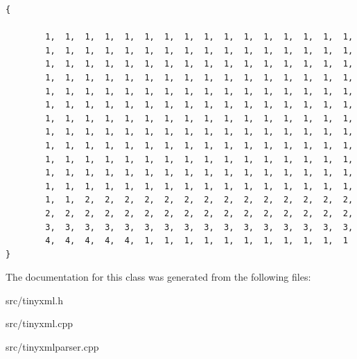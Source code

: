 \footnotesize\begin{verbatim} 
{
    
        1,  1,  1,  1,  1,  1,  1,  1,  1,  1,  1,  1,  1,  1,  1,  1,  
        1,  1,  1,  1,  1,  1,  1,  1,  1,  1,  1,  1,  1,  1,  1,  1,  
        1,  1,  1,  1,  1,  1,  1,  1,  1,  1,  1,  1,  1,  1,  1,  1,  
        1,  1,  1,  1,  1,  1,  1,  1,  1,  1,  1,  1,  1,  1,  1,  1,  
        1,  1,  1,  1,  1,  1,  1,  1,  1,  1,  1,  1,  1,  1,  1,  1,  
        1,  1,  1,  1,  1,  1,  1,  1,  1,  1,  1,  1,  1,  1,  1,  1,  
        1,  1,  1,  1,  1,  1,  1,  1,  1,  1,  1,  1,  1,  1,  1,  1,  
        1,  1,  1,  1,  1,  1,  1,  1,  1,  1,  1,  1,  1,  1,  1,  1,  
        1,  1,  1,  1,  1,  1,  1,  1,  1,  1,  1,  1,  1,  1,  1,  1,  
        1,  1,  1,  1,  1,  1,  1,  1,  1,  1,  1,  1,  1,  1,  1,  1,  
        1,  1,  1,  1,  1,  1,  1,  1,  1,  1,  1,  1,  1,  1,  1,  1,  
        1,  1,  1,  1,  1,  1,  1,  1,  1,  1,  1,  1,  1,  1,  1,  1,  
        1,  1,  2,  2,  2,  2,  2,  2,  2,  2,  2,  2,  2,  2,  2,  2,  
        2,  2,  2,  2,  2,  2,  2,  2,  2,  2,  2,  2,  2,  2,  2,  2,  
        3,  3,  3,  3,  3,  3,  3,  3,  3,  3,  3,  3,  3,  3,  3,  3,  
        4,  4,  4,  4,  4,  1,  1,  1,  1,  1,  1,  1,  1,  1,  1,  1   
}
\end{verbatim}\normalsize 


The documentation for this class was generated from the following files:\begin{CompactItemize}
\item 
src/tinyxml.h\item 
src/tinyxml.cpp\item 
src/tinyxmlparser.cpp\end{CompactItemize}
